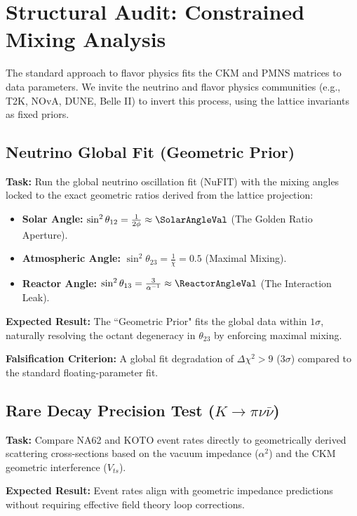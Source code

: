 \section{Structural Audit: Constrained Mixing Analysis}

The standard approach to flavor physics fits the CKM and PMNS matrices to data parameters. We invite the neutrino and flavor physics communities (e.g., T2K, NOvA, DUNE, Belle II) to invert this process, using the lattice invariants as fixed priors.

\subsection{Neutrino Global Fit (Geometric Prior)}

\textbf{Task:} Run the global neutrino oscillation fit (NuFIT) with the mixing angles locked to the exact geometric ratios derived from the lattice projection:
\begin{itemize}
    \item \textbf{Solar Angle:} $\sin^2 \theta_{12} = \frac{1}{2\phi} \approx \SolarAngleVal$ (The Golden Ratio Aperture).
    \item \textbf{Atmospheric Angle:} $\sin^2 \theta_{23} = \frac{1}{\chi} = 0.5$ (Maximal Mixing).
    \item \textbf{Reactor Angle:} $\sin^2 \theta_{13} = \frac{3}{\alpha^{-1}} \approx \ReactorAngleVal$ (The Interaction Leak).
\end{itemize}

\textbf{Expected Result:} The ``Geometric Prior" fits the global data within $1\sigma$, naturally resolving the octant degeneracy in $\theta_{23}$ by enforcing maximal mixing.

\textbf{Falsification Criterion:} A global fit degradation of $\Delta\chi^2 > 9$ ($3\sigma$) compared to the standard floating-parameter fit.

\subsection{Rare Decay Precision Test (\texorpdfstring{$K \to \pi\nu\bar{\nu}$}{Ktopinubar})}

\textbf{Task:} Compare NA62 and KOTO event rates directly to geometrically derived scattering cross-sections based on the vacuum impedance ($\alpha^2$) and the CKM geometric interference ($V_{ts}$).

\textbf{Expected Result:} Event rates align with geometric impedance predictions without requiring effective field theory loop corrections.


